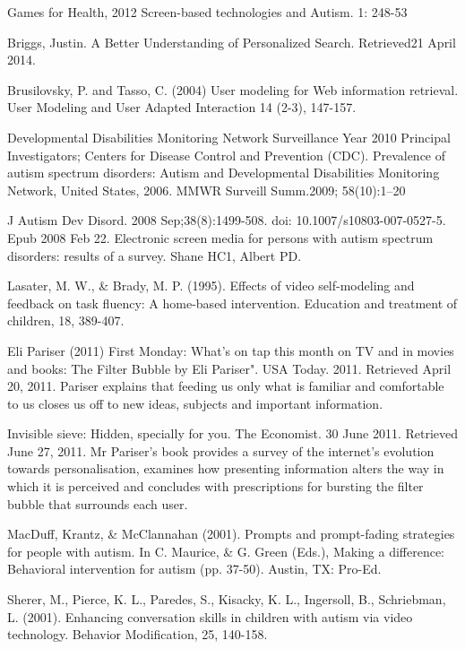 \documentclass[10pt]{article}
\begin{document}
\begin{thebibliography}{100}

 Games for Health, 2012 Screen-based technologies and Autism. 1: 248-53


Briggs, Justin. A Better Understanding of Personalized Search. Retrieved21 April 2014.


Brusilovsky, P. and Tasso, C. (2004) User modeling for Web information retrieval. User Modeling and User Adapted Interaction 14 (2-3), 147-157.


Developmental Disabilities Monitoring Network Surveillance Year 2010 Principal Investigators; Centers for Disease Control and Prevention (CDC). Prevalence of autism spectrum disorders: Autism and Developmental Disabilities Monitoring Network, United States, 2006. MMWR Surveill Summ.2009; 58(10):1–20


J Autism Dev Disord. 2008 Sep;38(8):1499-508. doi: 10.1007/s10803-007-0527-5. Epub 2008 Feb 22.
Electronic screen media for persons with autism spectrum disorders: results of a survey.
Shane HC1, Albert PD.


Lasater, M. W., \& Brady, M. P. (1995). Effects of video self-modeling and feedback on task fluency: A home-based intervention. Education and treatment of children, 18, 389-407.


Eli Pariser (2011) First Monday: What's on tap this month on TV and in movies and books: The Filter Bubble by Eli Pariser". USA Today. 2011. Retrieved April 20, 2011. Pariser explains that feeding us only what is familiar and comfortable to us closes us off to new ideas, subjects and important information.


 Invisible sieve: Hidden, specially for you. The Economist. 30 June 2011. Retrieved June 27, 2011. Mr Pariser’s book provides a survey of the internet’s evolution towards personalisation, examines how presenting information alters the way in which it is perceived and concludes with prescriptions for bursting the filter bubble that surrounds each user.

 MacDuff, Krantz, \& McClannahan (2001). Prompts and prompt-fading strategies for people with autism. In C. Maurice, \& G. Green (Eds.), Making a difference: Behavioral intervention for autism (pp. 37-50). Austin, TX: Pro-Ed.


Sherer, M., Pierce, K. L., Paredes, S., Kisacky, K. L., Ingersoll, B., Schriebman, L. (2001). Enhancing conversation skills in children with autism via video technology. Behavior Modification, 25, 140-158.



\end{thebibliography}
\end{document}

